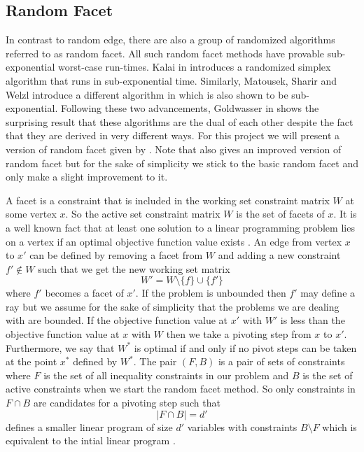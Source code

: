 \documentclass{standalone}
\begin{document}
\subsection{Random Facet}
\label{sec:pivot:randomf}
{
  In contrast to random edge, there are also a group of randomized algorithms referred to as random facet. All such random facet methods have provable sub-exponential worst-case run-times. Kalai in \cite{kalai1992subexponential} introduces a randomized simplex algorithm that runs in sub-exponential time. Similarly, Matousek, Sharir and Welzl introduce a different algorithm in \cite{matouvsek1996subexponential} which is also shown to be sub-exponential. Following these two advancements, Goldwasser in \cite{goldwasser1995survey} shows the surprising result that these algorithms are the dual of each other despite the fact that they are derived in very different ways. For this project we will present a version of random facet given by \cite{hansen2015improved}. Note that \cite{hansen2015improved} also gives an improved version of random facet but for the sake of simplicity we stick to the basic random facet and only make a slight improvement to it.\par
  A facet is a constraint that is included in the working set constraint matrix $W$ at some vertex $x$. So the active set constraint matrix $W$ is the set of facets of $x$. It is a well known fact that at least one solution to a linear programming problem lies on a vertex if an optimal objective function value exists \cite{hansen2015improved}. An edge from vertex $x$ to $x'$ can be defined by removing a facet from $W$ and adding a new constraint $f'\notin W$ such that we get the new working set matrix
  \[
    W'= W \setminus \{f\} \cup \{f'\}
  \]
  where $f'$ becomes a facet of $x'$. If the problem is unbounded then $f'$ may define a ray but we assume for the sake of simplicity that the problems we are dealing with are bounded. If the objective function value at $x'$ with $W'$ is less than the objective function value at $x$ with $W$ then we take a pivoting step from $x$ to $x'$. Furthermore, we say that $W^{*}$ is optimal if and only if no pivot steps can be taken at the point $x^{*}$ defined by $W^{*}$. The pair $(F,B)$ is a pair of sets of constraints where $F$ is the set of all inequality constraints in our problem and $B$ is the set of active constraints when we start the random facet method. So only constraints in $F\cap B$ are candidates for a pivoting step such that
  \[
    \left|F\cap B\right|=d'
  \]
  defines a smaller linear program of size $d'$ variables with constraints $B\setminus F$ which is equivalent to the intial linear program \cite{hansen2015improved}.\par
}
\end{document}
